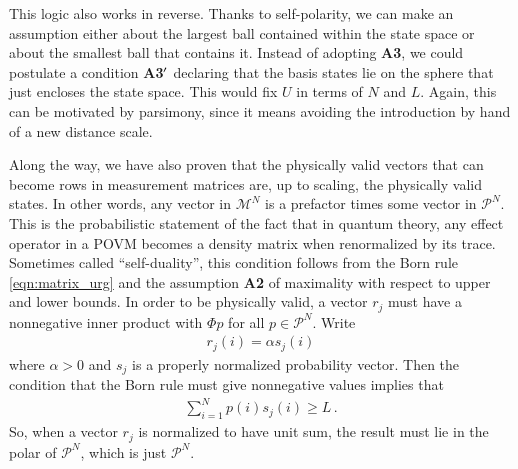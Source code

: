 \documentclass[%
 reprint,superscriptaddress,
 amsmath,amssymb,
 aps,twocolumn,pra
]{revtex4-1}
\newcommand{\eqn}[1]{\begin{eqnarray} #1 \end{eqnarray}}
\newcommand{\zum}[2]{\displaystyle\sum_{#1}^{#2}}
\begin{document}
\begin{appendix}
This logic also works in reverse. Thanks to self-polarity, we can make an assumption either about the largest ball contained within the state space or about the smallest ball that contains it. Instead of adopting {\bf A3}, we could postulate a condition {\bf A3}${\bf '}$ declaring that the basis states lie on the sphere that just encloses the state space. This would fix $U$ in terms of $N$ and $L$. Again, this can be motivated by parsimony, since it means avoiding the introduction by hand of a new distance scale.

Along the way, we have also proven that the physically valid vectors that can become rows in measurement matrices are, up to scaling, the physically valid states. In other words, any vector in $\mathcal{M}^N$ is a prefactor times some vector in $\mathcal{P}^N$. This is the probabilistic statement of the fact that in quantum theory, any effect operator in a POVM becomes a density matrix when renormalized by its trace. Sometimes called ``self-duality'', this condition follows from the Born rule \eqref{eqn:matrix_urg} and the assumption {\bf A2} of maximality with respect to upper and lower bounds. In order to be physically valid, a vector $r_j$ must have a nonnegative inner product with $\Phi p$ for all $p \in \mathcal{P}^N$. Write
\eqn{
  r_j(i) = \alpha s_j(i)
}
where $\alpha > 0$ and $s_j$ is a properly normalized probability vector. Then the condition that the Born rule must give nonnegative values implies that
\eqn{
  \zum{i=1}{N} p(i) s_j(i) \geq L \, .
}
So, when a vector $r_j$ is normalized to have unit sum, the result must lie in the polar of $\mathcal{P}^N$, which is just $\mathcal{P}^N$.


\end{appendix}
\end{document}
